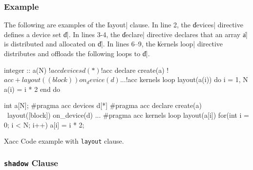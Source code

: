 

\subsubsection*{Example}

The following are examples of the \|layout| clause.
In line 2, the \|devices| directive defines a device set \|d|.
In lines 3-4, the \|declare| directive declares that an array \|a|
is distributed and allocated on \|d|.
In lines 6--9, the \|kernels loop| directive distributes and offloads
the following loops to \|d|.
%
\begin{myfigure}
\begin{minipage}{0.47\hsize}
\begin{center}
\begin{XACCFexampleL}
integer :: a(N)
!$acc devices d(*)
!$acc declare create(a)
!$acc+layout((block)) on_device(d)
...
!$acc kernels loop layout(a(i))
do i = 1, N
  a(i) = i * 2
end do
\end{XACCFexampleL}
\end{center}
\end{minipage}
%
\begin{minipage}{0.51\hsize}
\begin{center}
\begin{XACCCexampleR}
int a[N];
#pragma acc devices d[*]
#pragma acc declare create(a) \
        layout([block]) on_device(d)
...
#pragma acc kernels loop layout(a[i])
for(int i = 0; i < N; i++){
  a[i] = i * 2;
}
\end{XACCCexampleR}
\end{center}
\end{minipage}
\caption{Xacc Code example with {\tt layout} clause.}\label{code:layout_clause}
\end{myfigure}


\subsubsection{{\tt shadow} Clause}

